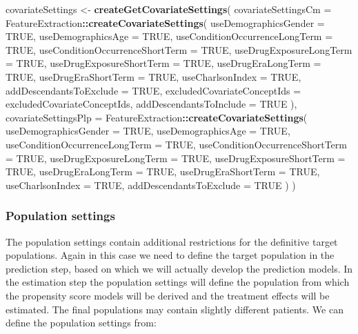 \documentclass[]{article}
\newenvironment{Shaded}{\begin{snugshade}}{\end{snugshade}}
\newcommand{\DataTypeTok}[1]{\textcolor[rgb]{0.13,0.29,0.53}{#1}}
\newcommand{\KeywordTok}[1]{\textcolor[rgb]{0.13,0.29,0.53}{\textbf{#1}}}
\newcommand{\NormalTok}[1]{#1}
\newcommand{\OperatorTok}[1]{\textcolor[rgb]{0.81,0.36,0.00}{\textbf{#1}}}
\newcommand{\OtherTok}[1]{\textcolor[rgb]{0.56,0.35,0.01}{#1}}
\newcommand{\StringTok}[1]{\textcolor[rgb]{0.31,0.60,0.02}{#1}}
\begin{document}
\begin{Shaded}
\begin{Highlighting}[]
\NormalTok{covariateSettings <{-}}\StringTok{ }\KeywordTok{createGetCovariateSettings}\NormalTok{(}
  \DataTypeTok{covariateSettingsCm =}\NormalTok{ FeatureExtraction}\OperatorTok{::}\KeywordTok{createCovariateSettings}\NormalTok{(}
    \DataTypeTok{useDemographicsGender =} \OtherTok{TRUE}\NormalTok{,}
    \DataTypeTok{useDemographicsAge =} \OtherTok{TRUE}\NormalTok{,}
    \DataTypeTok{useConditionOccurrenceLongTerm =} \OtherTok{TRUE}\NormalTok{,}
    \DataTypeTok{useConditionOccurrenceShortTerm =} \OtherTok{TRUE}\NormalTok{,}
    \DataTypeTok{useDrugExposureLongTerm =} \OtherTok{TRUE}\NormalTok{,}
    \DataTypeTok{useDrugExposureShortTerm =} \OtherTok{TRUE}\NormalTok{,}
    \DataTypeTok{useDrugEraLongTerm =} \OtherTok{TRUE}\NormalTok{,}
    \DataTypeTok{useDrugEraShortTerm =} \OtherTok{TRUE}\NormalTok{,}
    \DataTypeTok{useCharlsonIndex =} \OtherTok{TRUE}\NormalTok{,}
    \DataTypeTok{addDescendantsToExclude =} \OtherTok{TRUE}\NormalTok{,}
    \DataTypeTok{excludedCovariateConceptIds =} 
\NormalTok{      excludedCovariateConceptIds,}
    \DataTypeTok{addDescendantsToInclude =} \OtherTok{TRUE}
\NormalTok{  ),}
  \DataTypeTok{covariateSettingsPlp =}\NormalTok{ FeatureExtraction}\OperatorTok{::}\KeywordTok{createCovariateSettings}\NormalTok{(}
    \DataTypeTok{useDemographicsGender =} \OtherTok{TRUE}\NormalTok{,}
    \DataTypeTok{useDemographicsAge =} \OtherTok{TRUE}\NormalTok{,}
    \DataTypeTok{useConditionOccurrenceLongTerm =} \OtherTok{TRUE}\NormalTok{,}
    \DataTypeTok{useConditionOccurrenceShortTerm =} \OtherTok{TRUE}\NormalTok{,}
    \DataTypeTok{useDrugExposureLongTerm =} \OtherTok{TRUE}\NormalTok{,}
    \DataTypeTok{useDrugExposureShortTerm =} \OtherTok{TRUE}\NormalTok{,}
    \DataTypeTok{useDrugEraLongTerm =} \OtherTok{TRUE}\NormalTok{,}
    \DataTypeTok{useDrugEraShortTerm =} \OtherTok{TRUE}\NormalTok{,}
    \DataTypeTok{useCharlsonIndex =} \OtherTok{TRUE}\NormalTok{,}
    \DataTypeTok{addDescendantsToExclude =} \OtherTok{TRUE}
\NormalTok{  )}
\NormalTok{)}
\end{Highlighting}
\end{Shaded}

\hypertarget{population-settings}{%
\subsubsection{Population settings}\label{population-settings}}

The population settings contain additional restrictions for the
definitive target populations. Again in this case we need to define the
target population in the prediction step, based on which we will
actually develop the prediction models. In the estimation step the
population settings will define the population from which the propensity
score models will be derived and the treatment effects will be
estimated. The final populations may contain slightly different
patients. We can define the population settings from:
\end{document}
